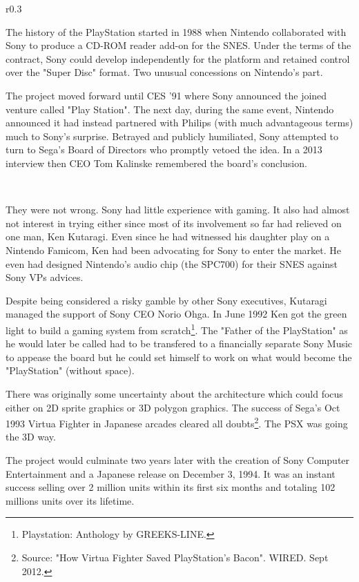 \begin{wrapfigure}[11]{r}{0.3\textwidth}{
\centering {}}
\end{wrapfigure}
The history of the PlayStation started in 1988 when Nintendo collaborated with Sony to produce a CD-ROM reader add-on for the SNES. Under the terms of the contract, Sony could develop independently for the platform and retained control over the "Super Disc" format. Two unusual concessions on Nintendo's part.\\
\par
 The project moved forward until CES '91 where Sony announced the joined venture called "Play Station". The next day, during the same event, Nintendo announced it had instead partnered with Philips (with much advantageous terms) much to Sony's surprise. Betrayed and publicly humiliated, Sony attempted to turn to Sega's Board of Directors who promptly vetoed the idea. In a 2013 interview then CEO Tom Kalinske remembered the board's conclusion.\\
\par
{}\\
\par
They were not wrong. Sony had little experience with gaming. It also had almost not interest in trying either since most of its involvement so far had relieved on one man, Ken Kutaragi. Even since he had witnessed his daughter play on a Nintendo Famicom, Ken had been advocating for Sony to enter the market. He even had designed Nintendo's audio chip (the SPC700) for their SNES against Sony VPs advices.\\
\par
 Despite being considered a risky gamble by other Sony executives, Kutaragi managed the support of Sony CEO Norio Ohga. In June 1992 Ken got the green light to build a gaming system from scratch\footnote{Playstation: Anthology by GREEKS-LINE.}. The "Father of the PlayStation" as he would later be called had to be transfered to a financially separate Sony Music to appease the board but he could set himself to work on what would become the "PlayStation" (without space).\\
\par
There was originally some uncertainty about the architecture which could focus either on 2D sprite graphics or 3D polygon graphics. The success of Sega's Oct 1993 Virtua Fighter in Japanese arcades cleared all doubts\footnote{Source: "How Virtua Fighter Saved PlayStation's Bacon". WIRED. Sept 2012.}. The PSX was going the 3D way.\\
\par
The project would culminate two years later with the creation of Sony Computer Entertainment and a Japanese release on December 3, 1994. It was an instant success selling over 2 million units within its first six months and totaling 102 millions units over its lifetime.\\
\par
{}


